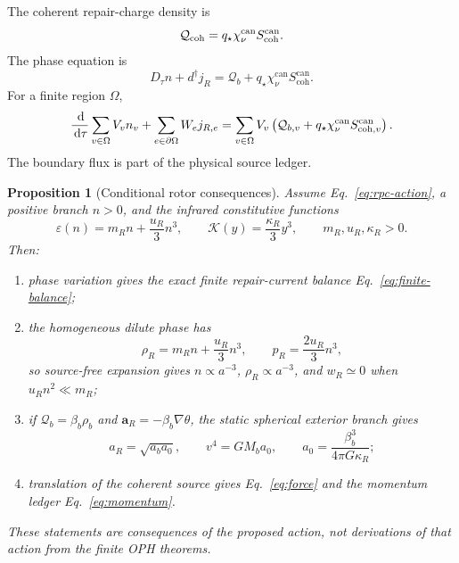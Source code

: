 \documentclass[11pt]{article}
\numberwithin{equation}{section}
\newtheorem{proposition}[theorem]{Proposition}
\theoremstyle{remark}
\newcommand{\chican}{\chi_\nu^{\mathrm{can}}}
\newcommand{\scohcan}{S_{\mathrm{coh}}^{\mathrm{can}}}
\newcommand{\dd}{\,\mathrm d}
\begin{document}
The coherent repair-charge density is
\begin{equation}
\mathcal Q_{\rm coh}=q_\star\chican\scohcan.
\label{eq:repair-charge-density}
\end{equation}
The phase equation is
\begin{equation}
D_\tau n+d^\dagger j_R
=\mathcal Q_b+q_\star\chican\scohcan.
\label{eq:continuity}
\end{equation}
For a finite region \(\Omega\),
\begin{equation}
\frac{\dd}{\dd\tau}\sum_{v\in\Omega}V_vn_v
+\sum_{e\in\partial\Omega}W_ej_{R,e}
=\sum_{v\in\Omega}V_v
\left(\mathcal Q_{b,v}+q_\star\chican
S_{{\rm coh},v}^{\rm can}\right).
\label{eq:finite-balance}
\end{equation}
The boundary flux is part of the physical source ledger.

\begin{proposition}[Conditional rotor consequences]
\label{prop:rotor-consequences}
Assume Eq.~\eqref{eq:rpc-action}, a positive branch \(n>0\), and the infrared
constitutive functions
\begin{equation}
\varepsilon(n)=m_Rn+\frac{u_R}{3}n^3,
\qquad
\mathcal K(y)=\frac{\kappa_R}{3}y^3,
\qquad
m_R,u_R,\kappa_R>0.
\label{eq:rpc-constitutive}
\end{equation}
Then:
\begin{enumerate}[label=(\roman*),leftmargin=*]
\item phase variation gives the exact finite repair-current balance
Eq.~\eqref{eq:finite-balance};
\item the homogeneous dilute phase has
\begin{equation}
\rho_R=m_Rn+\frac{u_R}{3}n^3,
\qquad
p_R=\frac{2u_R}{3}n^3,
\end{equation}
so source-free expansion gives \(n\propto a^{-3}\),
\(\rho_R\propto a^{-3}\), and \(w_R\simeq0\) when
\(u_Rn^2\ll m_R\);
\item if \(\mathcal Q_b=\beta_b\rho_b\) and
\(\mathbf a_R=-\beta_b\nabla\theta\), the static spherical exterior branch
gives
\begin{equation}
a_R=\sqrt{a_ba_0},
\qquad
v^4=GM_ba_0,
\qquad
a_0=\frac{\beta_b^3}{4\pi G\kappa_R};
\end{equation}
\item translation of the coherent source gives
Eq.~\eqref{eq:force} and the momentum ledger
Eq.~\eqref{eq:momentum}.
\end{enumerate}
These statements are consequences of the proposed action, not derivations of
that action from the finite OPH theorems.
\end{proposition}
\end{document}
